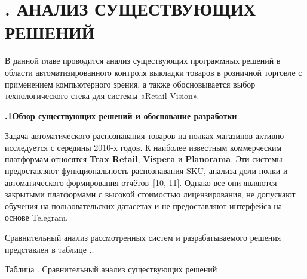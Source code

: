 \setcounter{chaptercntr}{2}

\sectionbreak \section*{
  \gostTitleFont
  \redline
  \thechaptercntr .
  АНАЛИЗ СУЩЕСТВУЮЩИХ РЕШЕНИЙ
}

\titlespace

{\gostFont

  \par \redline В данной главе проводится анализ существующих программных решений
  в области автоматизированного контроля выкладки товаров в розничной торговле
  с применением компьютерного зрения, а также обосновывается выбор технологического
  стека для системы «Retail Vision».

  \subtitlespace
  \par \redline \textbf{\thechaptercntr .1\spc Обзор существующих решений
  и обоснование разработки}
  \subtitlespace

  \par \redline Задача автоматического распознавания товаров на полках магазинов
  активно исследуется с середины 2010-х годов.
  К наиболее известным коммерческим платформам относятся \textbf{Trax Retail},
  \textbf{Vispera} и \textbf{Planorama}.
  Эти системы предоставляют функциональность распознавания SKU, анализа доли
  полки и автоматического формирования отчётов~[10, 11].
  Однако все они являются закрытыми платформами с высокой стоимостью
  лицензирования, не допускают обучения на пользовательских датасетах
  и не предоставляют интерфейса на основе Telegram.

  \par \redline Сравнительный анализ рассмотренных систем и разрабатываемого
  решения представлен в таблице \thechaptercntr .\thetablecntr.

  \topTablespace
  \begin{Center}
    \par \gostFont Таблица \thechaptercntr .\thetablecntr \spc {--}
    Сравнительный анализ существующих решений


\end{Center}}
